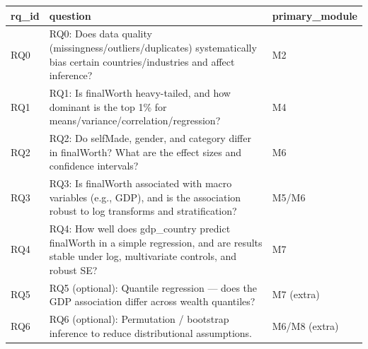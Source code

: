 \begin{tabular}{lll}
\toprule
rq\_id & question & primary\_module \\
\midrule
RQ0 & RQ0: Does data quality (missingness/outliers/duplicates) systematically bias certain countries/industries and affect inference? & M2 \\
RQ1 & RQ1: Is finalWorth heavy-tailed, and how dominant is the top 1\% for means/variance/correlation/regression? & M4 \\
RQ2 & RQ2: Do selfMade, gender, and category differ in finalWorth? What are the effect sizes and confidence intervals? & M6 \\
RQ3 & RQ3: Is finalWorth associated with macro variables (e.g., GDP), and is the association robust to log transforms and stratification? & M5/M6 \\
RQ4 & RQ4: How well does gdp\_country predict finalWorth in a simple regression, and are results stable under log, multivariate controls, and robust SE? & M7 \\
RQ5 & RQ5 (optional): Quantile regression — does the GDP association differ across wealth quantiles? & M7 (extra) \\
RQ6 & RQ6 (optional): Permutation / bootstrap inference to reduce distributional assumptions. & M6/M8 (extra) \\
\bottomrule
\end{tabular}
